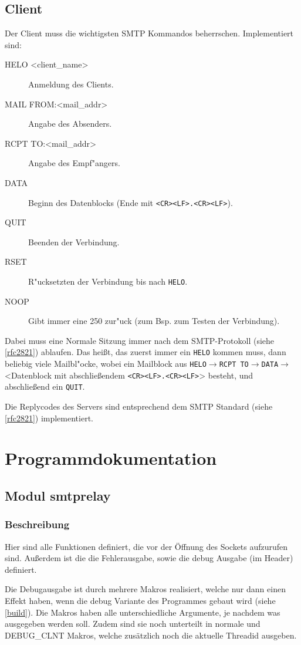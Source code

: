 \documentclass[pdftex,final,a4paper,10pt,notitlepage,halfparskip]{scrreprt}
\begin{document}
\section{Client}
Der Client muss die wichtigsten SMTP Kommandos beherrschen. Implementiert sind:
\begin{description}
  \item[HELO <client\_name>] Anmeldung des Clients.
  \item[MAIL FROM:<mail\_addr>] Angabe des Absenders.
  \item[RCPT TO:<mail\_addr>] Angabe des Empf"{a}ngers.
  \item[DATA] Beginn des Datenblocks (Ende mit \texttt{<CR><LF>.<CR><LF>}).
  \item[QUIT] Beenden der Verbindung.
  \item[RSET] R"{u}cksetzten der Verbindung bis nach \texttt{HELO}. 
  \item[NOOP] Gibt immer eine 250 zur"{u}ck (zum Bsp. zum Testen der Verbindung).
\end{description}

Dabei muss eine Normale Sitzung immer nach dem SMTP-Protokoll (siehe \ref{rfc2821}) ablaufen. Das heißt, das zuerst immer ein \texttt{HELO} kommen muss, dann beliebig viele Mailbl"{o}cke, wobei ein Mailblock aus \texttt{HELO}$\rightarrow$\texttt{RCPT TO}$\rightarrow$\texttt{DATA}$\rightarrow$<Datenblock mit abschließendem \texttt{<CR><LF>.<CR><LF>}> besteht, und abschließend ein \texttt{QUIT}.

Die Replycodes des Servers sind entsprechend dem SMTP Standard (siehe \ref{rfc2821}) implementiert.

\chapter{Programmdokumentation}
\section{Modul smtprelay}\label{mod:smtprelay}
\subsection{Beschreibung}
Hier sind alle Funktionen definiert, die vor der Öffnung des Sockets aufzurufen sind. Außerdem ist die die Fehlerausgabe, sowie die debug Ausgabe (im Header) definiert. 

Die Debugausgabe ist durch mehrere Makros realisiert, welche nur dann einen Effekt haben, wenn die debug Variante des Programmes gebaut wird (siehe \ref{build}). Die Makros haben alle unterschiedliche Argumente, je nachdem was ausgegeben werden soll. Zudem sind sie noch unterteilt in normale und DEBUG\_CLNT Makros, welche zusätzlich noch die aktuelle Threadid ausgeben.
\end{document}
